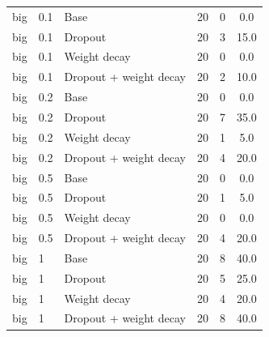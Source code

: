 \begin{longtable}{llllcc}
big & 0.1 & Base & 20 & 0 & 0.0 \\
big & 0.1 & Dropout & 20 & 3 & 15.0 \\
big & 0.1 & Weight decay & 20 & 0 & 0.0 \\
big & 0.1 & Dropout + weight decay & 20 & 2 & 10.0 \\
big & 0.2 & Base & 20 & 0 & 0.0 \\
big & 0.2 & Dropout & 20 & 7 & 35.0 \\
big & 0.2 & Weight decay & 20 & 1 & 5.0 \\
big & 0.2 & Dropout + weight decay & 20 & 4 & 20.0 \\
big & 0.5 & Base & 20 & 0 & 0.0 \\
big & 0.5 & Dropout & 20 & 1 & 5.0 \\
big & 0.5 & Weight decay & 20 & 0 & 0.0 \\
big & 0.5 & Dropout + weight decay & 20 & 4 & 20.0 \\
big & 1 & Base & 20 & 8 & 40.0 \\
big & 1 & Dropout & 20 & 5 & 25.0 \\
big & 1 & Weight decay & 20 & 4 & 20.0 \\
big & 1 & Dropout + weight decay & 20 & 8 & 40.0 \\
\end{longtable}
